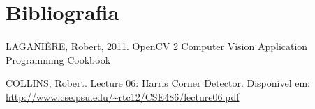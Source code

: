 \documentclass[conference,harvard,brazil,english]{sbatex}
\begin{document}
	\section{Bibliografia}
	\paragraph{} LAGANIÈRE, Robert, 2011. OpenCV 2 Computer Vision Application
	Programming Cookbook 
	\par COLLINS, Robert. Lecture 06:
	Harris Corner Detector. Disponível em:\\
	\url{http://www.cse.psu.edu/~rtc12/CSE486/lecture06.pdf}
	
	
	
	
\end{document}
